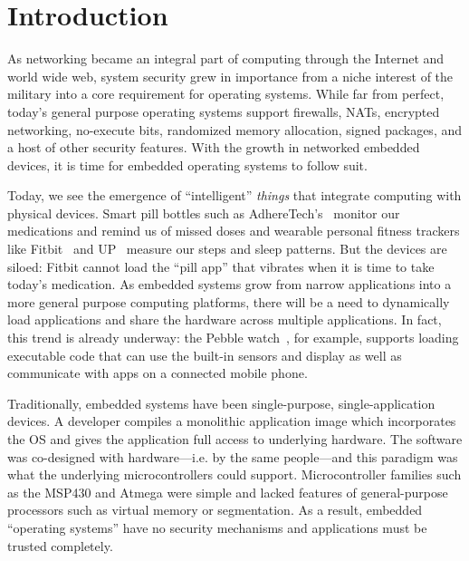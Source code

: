 \section{Introduction}

As networking became an integral part of computing through the Internet and
world wide web, system security grew in importance from a niche interest of the
military into a core requirement for operating systems. While far from perfect,
today's general purpose operating systems support firewalls, NATs, encrypted
networking, no-execute bits, randomized memory allocation, signed packages, and a
host of other security features. With the growth in networked embedded
devices, it is time for embedded operating systems to follow suit.

Today, we see the emergence of ``intelligent'' \textit{things} that integrate
computing with physical devices.
Smart pill bottles such as AdhereTech's~\cite{adheretech} monitor our
medications and remind us of missed doses and wearable personal fitness trackers
like Fitbit~\cite{fitbit} and UP~\cite{jawboneup} measure our steps and sleep
patterns. But the devices are siloed: Fitbit cannot load the ``pill app'' that
vibrates when it is time to take today's medication.
As embedded systems grow from narrow applications into a more general
purpose computing platforms, there will be a need to dynamically load
applications and share the hardware across multiple applications. In fact, this
trend is already underway: the Pebble watch~\cite{pebble}, for example, supports loading
executable code that can use the built-in sensors and display as well as
communicate with apps on a connected mobile phone.


Traditionally, embedded systems have been single-purpose, single-application
devices. A developer compiles a monolithic application image which incorporates
the OS and gives the application full access to underlying hardware.
The software was co-designed with hardware---i.e. by the same
people---and this paradigm was what the
underlying microcontrollers could support.
Microcontroller families such as the MSP430 and Atmega were simple and
lacked features of general-purpose processors such as virtual
memory or segmentation. As a result, embedded ``operating systems'' have no
security mechanisms and applications must be trusted completely.

